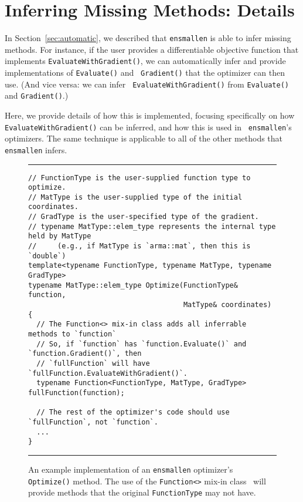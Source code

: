 \section{Inferring Missing Methods: Details}
\label{sec:automatic_details}

In Section~\ref{sec:automatic}, we described that {\tt ensmallen} is able to
infer missing methods.  For instance, if the user provides a differentiable
objective function that implements {\tt EvaluateWithGradient()}, we can
automatically infer and provide implementations of {\tt Evaluate()} and {\tt
Gradient()} that the optimizer can then use.  (And vice versa: we can infer {\tt
EvaluateWithGradient()} from {\tt Evaluate()} and {\tt Gradient()}.)

Here, we provide details of how this is implemented, focusing specifically on
how {\tt EvaluateWithGradient()} can be inferred, and how this is used in {\tt
ensmallen}'s optimizers.  The same technique is applicable to all of the other
methods that {\tt ensmallen} infers.

\begin{figure}[t]
\hrule
\vspace{1ex}
\begin{verbatim}
// FunctionType is the user-supplied function type to optimize.
// MatType is the user-supplied type of the initial coordinates.
// GradType is the user-specified type of the gradient.
// typename MatType::elem_type represents the internal type held by MatType
//     (e.g., if MatType is `arma::mat`, then this is `double`)
template<typename FunctionType, typename MatType, typename GradType>
typename MatType::elem_type Optimize(FunctionType& function,
                                     MatType& coordinates)
{ 
  // The Function<> mix-in class adds all inferrable methods to `function`
  // So, if `function` has `function.Evaluate()` and `function.Gradient()`, then
  // `fullFunction` will have `fullFunction.EvaluateWithGradient()`.
  typename Function<FunctionType, MatType, GradType> fullFunction(function);
  
  // The rest of the optimizer's code should use `fullFunction`, not `function`.
  ...
}
\end{verbatim}
\hrule
\vspace*{-0.5em}
\caption{An example implementation of an {\tt ensmallen} optimizer's
{\tt Optimize()} method.
The use of the {\tt Function<>} mix-in class~\cite{smaragdakis2000mixin}
will provide methods that the original {\tt FunctionType} may not have.
}
\label{fig:ex_optimize}
\end{figure}

